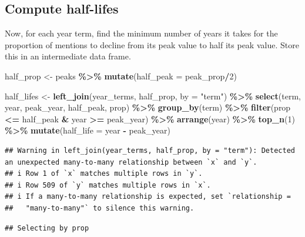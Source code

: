\documentclass[
]{article}
\newenvironment{Shaded}{\begin{snugshade}}{\end{snugshade}}
\newcommand{\AttributeTok}[1]{\textcolor[rgb]{0.13,0.29,0.53}{#1}}
\newcommand{\DecValTok}[1]{\textcolor[rgb]{0.00,0.00,0.81}{#1}}
\newcommand{\FunctionTok}[1]{\textcolor[rgb]{0.13,0.29,0.53}{\textbf{#1}}}
\newcommand{\NormalTok}[1]{#1}
\newcommand{\OtherTok}[1]{\textcolor[rgb]{0.56,0.35,0.01}{#1}}
\newcommand{\SpecialCharTok}[1]{\textcolor[rgb]{0.81,0.36,0.00}{\textbf{#1}}}
\newcommand{\StringTok}[1]{\textcolor[rgb]{0.31,0.60,0.02}{#1}}
\begin{document}
\hypertarget{compute-half-lifes}{%
\subsection{Compute half-lifes}\label{compute-half-lifes}}

Now, for each year term, find the minimum number of years it takes for
the proportion of mentions to decline from its peak value to half its
peak value. Store this in an intermediate data frame.

\begin{Shaded}
\begin{Highlighting}[]
\NormalTok{half\_prop }\OtherTok{\textless{}{-}}\NormalTok{ peaks }\SpecialCharTok{\%\textgreater{}\%}
  \FunctionTok{mutate}\NormalTok{(}\AttributeTok{half\_peak =}\NormalTok{ peak\_prop}\SpecialCharTok{/}\DecValTok{2}\NormalTok{)}

\NormalTok{half\_lifes }\OtherTok{\textless{}{-}} \FunctionTok{left\_join}\NormalTok{(year\_terms, half\_prop, }\AttributeTok{by =} \StringTok{"term"}\NormalTok{) }\SpecialCharTok{\%\textgreater{}\%} 
  \FunctionTok{select}\NormalTok{(term, year, peak\_year, half\_peak, prop) }\SpecialCharTok{\%\textgreater{}\%} 
  \FunctionTok{group\_by}\NormalTok{(term) }\SpecialCharTok{\%\textgreater{}\%} 
  \FunctionTok{filter}\NormalTok{(prop }\SpecialCharTok{\textless{}=}\NormalTok{ half\_peak }\SpecialCharTok{\&}\NormalTok{ year }\SpecialCharTok{\textgreater{}=}\NormalTok{ peak\_year) }\SpecialCharTok{\%\textgreater{}\%} 
  \FunctionTok{arrange}\NormalTok{(year) }\SpecialCharTok{\%\textgreater{}\%} 
  \FunctionTok{top\_n}\NormalTok{(}\DecValTok{1}\NormalTok{) }\SpecialCharTok{\%\textgreater{}\%} 
  \FunctionTok{mutate}\NormalTok{(}\AttributeTok{half\_life =}\NormalTok{ year }\SpecialCharTok{{-}}\NormalTok{ peak\_year)}
\end{Highlighting}
\end{Shaded}

\begin{verbatim}
## Warning in left_join(year_terms, half_prop, by = "term"): Detected an unexpected many-to-many relationship between `x` and `y`.
## i Row 1 of `x` matches multiple rows in `y`.
## i Row 509 of `y` matches multiple rows in `x`.
## i If a many-to-many relationship is expected, set `relationship =
##   "many-to-many"` to silence this warning.
\end{verbatim}

\begin{verbatim}
## Selecting by prop
\end{verbatim}
\end{document}
